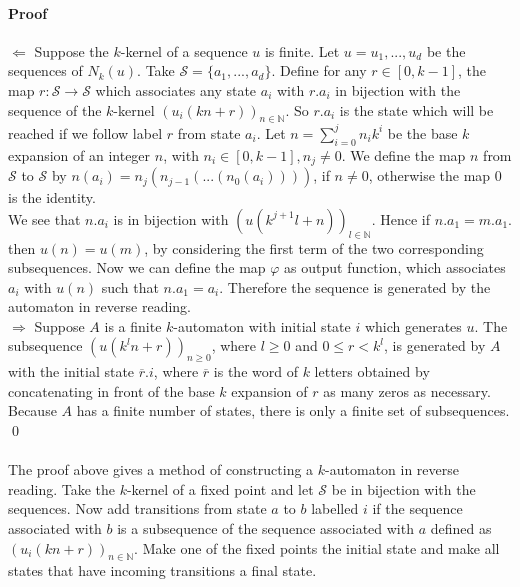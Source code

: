 \documentclass{article}
\begin{document}
\paragraph{Proof}
$\Leftarrow$ Suppose the $k$-kernel of a sequence $u$ is finite. Let
$u = u_1, ..., u_d$ be the sequences of $N_k(u)$. Take
$\mathcal{S} = \{a_1, ..., a_d\}$. Define for any $r \in [0, k - 1]$, the map
$r : \mathcal{S} \rightarrow \mathcal{S}$ which associates any state $a_i$ with
$r.a_i$ in bijection with the sequence of the $k$-kernel
$(u_i(kn + r))_{n \in \mathbb{N}}$. So $r.a_i$ is the state which will be
reached if we follow label $r$ from state $a_i$. Let
$n = \sum_{i = 0}^j n_i k^i$ be the base $k$ expansion of an integer $n$, with
$n_i \in [0, k - 1], n_j \ne 0$.  We define the map $n$ from
$\mathcal{S}$ to $\mathcal{S}$ by $n(a_i) = n_j(n_{j - 1}( ... (n_0(a_i))))$,
if $n \ne 0$, otherwise the map 0 is the identity.\\
We see that $n.a_i$ is in bijection with
$(u(k^{j + 1} l + n))_{l \in \mathbb{N}}$. Hence if $n.a_1 = m.a_1$. then
$u(n) = u(m)$, by considering the first term of the two corresponding
subsequences. Now we can define the map $\varphi$ as output function, which
associates $a_i$ with $u(n)$ such that $n.a_1 = a_i$. Therefore the sequence
is generated by the automaton in reverse reading.\\
$\Rightarrow$ Suppose $A$ is a finite $k$-automaton with initial state $i$
which generates $u$. The subsequence $(u(k^ln + r))_{n \ge 0}$, where
$l \ge 0$ and $0 \le r < k^l$, is generated by $A$ with the initial state
$\overline{r}.i$, where $\overline{r}$ is the word of $k$ letters obtained
by concatenating in front of the base $k$ expansion of $r$ as many zeros as
necessary. Because $A$ has a finite number of states, there is only a finite
set of subsequences. \qed\\
\\
The proof above gives a method of constructing a $k$-automaton in reverse
reading. Take the $k$-kernel of a fixed point and let $\mathcal{S}$ be in
bijection with the sequences. Now add transitions from state $a$ to $b$
labelled $i$ if the sequence associated with $b$ is a subsequence of the
sequence associated with $a$ defined as $(u_i(kn + r))_{n \in \mathbb{N}}$.
Make one of the fixed points the initial state and make all states that have
incoming transitions a final state.
\end{document}
